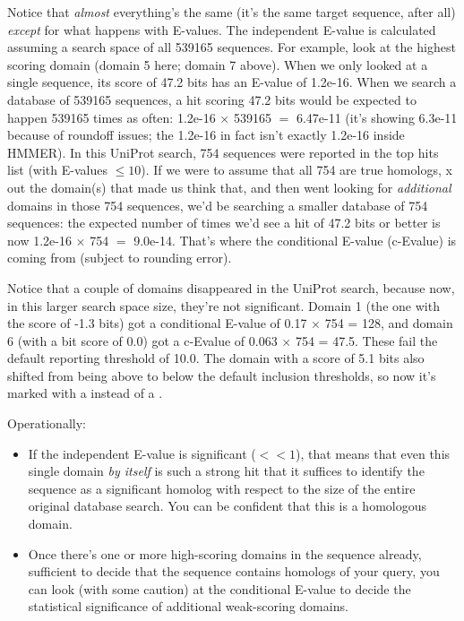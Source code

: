 Notice that \emph{almost} everything's the same (it's the same target
sequence, after all) \emph{except} for what happens with E-values. The
independent E-value is calculated assuming a search space of all
539165 sequences. For example, look at the highest scoring domain
(domain 5 here; domain 7 above). When we only looked at a single
sequence, its score of 47.2 bits has an E-value of 1.2e-16. When we
search a database of 539165 sequences, a hit scoring 47.2 bits would
be expected to happen 539165 times as often: 1.2e-16 $\times$ 539165
$=$ 6.47e-11 (it's showing 6.3e-11 because of roundoff issues; the
1.2e-16 in fact isn't exactly 1.2e-16 inside HMMER). In this UniProt
search, 754 sequences were reported in the top hits list (with
E-values $\leq 10$). If we were to assume that all 754 are true
homologs, x out the domain(s) that made us think that, and then went
looking for \emph{additional} domains in those 754 sequences, we'd be
searching a smaller database of 754 sequences: the expected number of
times we'd see a hit of 47.2 bits or better is now 1.2e-16 $\times$
754 $=$ 9.0e-14. That's where the conditional E-value (c-Evalue) is
coming from (subject to rounding error).

Notice that a couple of domains disappeared in the UniProt search,
because now, in this larger search space size, they're not
significant. Domain 1 (the one with the score of -1.3 bits) got a
conditional E-value of 0.17 $\times$ 754 = 128, and domain 6 (with a
bit score of 0.0) got a c-Evalue of 0.063 $\times$ 754 = 47.5. These
fail the default reporting threshold of 10.0. The domain with a score
of 5.1 bits also shifted from being above to below the default
inclusion thresholds, so now it's marked with a  instead of a
\ccode{!}.

Operationally:

\begin{itemize}
\item If the independent E-value is significant ($<<1$), that means
that even this single domain \emph{by itself} is such a strong hit
that it suffices to identify the sequence as a significant homolog
with respect to the size of the entire original database search. You
can be confident that this is a homologous domain.

\item Once there's one or more high-scoring domains in the sequence
already, sufficient to decide that the sequence contains homologs of
your query, you can look (with some caution) at the conditional
E-value to decide the statistical significance of additional
weak-scoring domains.
\end{itemize}

